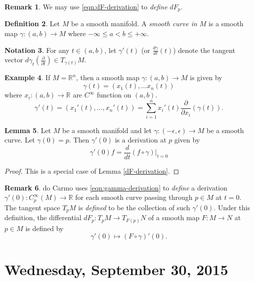 \documentclass{amsart}
\numberwithin{equation}{section}
\newcommand{\bR}{\mathbb{R}}
\theoremstyle{definition}
\newtheorem{definition}{Definition} [section]
\newtheorem{example}[definition]{Example}
\newtheorem{remark}[definition]{Remark}
\newtheorem{notation}[definition]{Notation}
\theoremstyle{theorem}
\newtheorem{lemma}[definition]{Lemma}
\begin{document}
\begin{remark}
We may use \eqref{eqn:dF-derivation} to {\em define} $dF_p$. 
\end{remark}


\begin{definition}
Let $M$ be a smooth manifold. A {\em smooth curve in $M$} is a smooth map $\gamma : (a,b) \to M$ where $-\infty \le a < b \le +\infty$. 
\end{definition}

\begin{notation}
For any $t \in (a,b)$, let $\gamma'(t)$ (or $\frac{d\gamma}{dt}(t)$) denote the tangent vector 
$d\gamma_t\left(\frac{\partial}{\partial t}\right) \in T_{\gamma(t)}M$. 
\end{notation}

\begin{example}
If $M = \mathbb{R}^n$, then a smooth map $\gamma : (a,b) \to M$ is given by 
$$
\gamma(t)=(x_1(t),\ldots x_n(t))
$$
where $x_i:(a,b)\to \bR$ are $C^\infty$ function on $(a,b)$.
$$
\gamma'(t)=(x_1'(t),\ldots, x_n'(t))=\sum_{i=1}^n x_i'(t)\frac{\partial}{\partial x_i}(\gamma(t)).
$$
\end{example}

\begin{lemma}
Let $M$ be a smooth manifold and let $\gamma : (-\epsilon, \epsilon) \to M$  be a smooth curve. Let $\gamma(0) = p$. Then $\gamma'(0)$ is a derivation at $p$ given by 
\begin{equation}\label{eqn:gamma-derivation}
\gamma'(0)f = \frac{d}{dt}(f \circ \gamma)|_{t=0} 
\end{equation}
\end{lemma}
\begin{proof}
This is a special case of Lemma \ref{dF-derivation}.
\end{proof}

\begin{remark} 
do Carmo uses \eqref{eqn:gamma-derivation} to {\em define} a derivation $\gamma'(0):C^\infty_p(M) \to \mathbb{R}$ for
each smooth curve passing through $p\in M$ at $t=0$. The tangent space $T_pM$ is {\em defined} to be the collection of such $\gamma'(0)$. 
Under this definition, the differential $dF_p:T_p M\to T_{F(p)}N$ of a smooth map $F: M \to N$ at $p\in M$ is defined by 
\[
\gamma'(0) \mapsto (F \circ \gamma)'(0).
\]
\end{remark}


\section{Wednesday, September 30, 2015}
\end{document}
